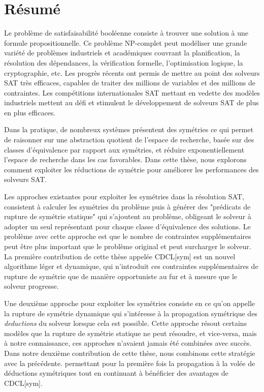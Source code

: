 

\chapter*{Résumé}

Le problème de satisfaisabilité booléenne consiste à trouver une solution à une formule  propositionnelle.
Ce problème NP-complet peut modéliser une grande variété de problèmes industriels et académiques couvrant la planification, la résolution des dépendances, la vérification formelle, l'optimisation logique, la cryptographie, etc.
Les  progrès récents ont permis de mettre au point des solveurs SAT très efficaces, capables de traiter des millions de variables et des millions de contraintes. 
Les compétitions internationales SAT mettant en vedette des modèles industriels mettent au défi et stimulent le développement de solveurs SAT de plus en plus efficaces.


Dans la pratique, de nombreux systèmes présentent des symétries ce qui permet de raisonner sur une abstraction quotient de l'espace de recherche, basée sur des classes d'équivalence par rapport aux symétries, et réduire exponentiellement l'espace de recherche dans les cas favorables.
Dans cette thèse, nous explorons comment exploiter les réductions de symétrie pour améliorer les performances des solveurs SAT.


Les approches existantes pour exploiter les symétries dans la résolution SAT, consistent à calculer les symétries du problème puis à générer des "prédicats de rupture de symétrie statique" qui s'ajoutent au problème, obligeant le solveur à adopter un seul représentant pour chaque classe d'équivalence des solutions.
Le problème avec cette approche est que le nombre de contraintes supplémentaires peut être plus important que le problème original et peut surcharger le solveur. La première contribution de cette thèse appelée CDCL[sym] est un nouvel algorithme léger et dynamique, qui n'introduit ces contraintes supplémentaires de rupture de symétrie que de manière opportuniste au fur et à mesure que le solveur progresse.

Une deuxième approche pour exploiter les symétries consiste en ce qu'on appelle la rupture de symétrie dynamique qui s'intéresse à la propagation symétrique des \textit{deductions} du solveur lorsque cela est possible.
Cette approche résout certains modèles que la rupture de symétrie statique ne peut résoudre, et vice-versa, mais à notre connaissance, ces approches n'avaient jamais été combinées avec succès. 
Dans notre deuxième contribution de cette thèse, nous combinons cette stratégie avec la précédente. permettant pour la première fois la propagation à la volée de déductions symétriques tout en continuant à bénéficier des avantages de CDCL[sym].

